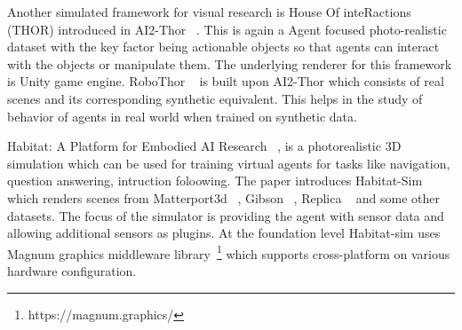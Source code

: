 Another simulated framework for visual research is House Of inteRactions (THOR) introduced in AI2-Thor ~\cite{kolve2019ai2thor}.
This is again a Agent focused photo-realistic dataset with the key factor being actionable objects so that agents can interact with the objects or manipulate them.
The underlying renderer for this framework is Unity game engine.
RoboThor ~\cite{Deitke2020RoboTHORAO} is built upon AI2-Thor which consists of real scenes and its corresponding synthetic equivalent.
This helps in the study of behavior of agents in real world when trained on synthetic data.

Habitat: A Platform for Embodied AI Research ~\cite{savva2019habitat}, is a photorealistic 3D simulation which can be used for training virtual agents for tasks like navigation, question answering, intruction foloowing.
The paper introduces Habitat-Sim which renders scenes from Matterport3d ~\cite{chang2017matterport3d}, Gibson ~\cite{xia2018gibson}, Replica ~\cite{Straub2019TheRD} and some other datasets.
The focus of the simulator is providing the agent with sensor data and allowing additional sensors as plugins.
At the foundation level Habitat-sim uses Magnum graphics
middleware library~\footnote{https://magnum.graphics/} which supports cross-platform on various hardware configuration.

